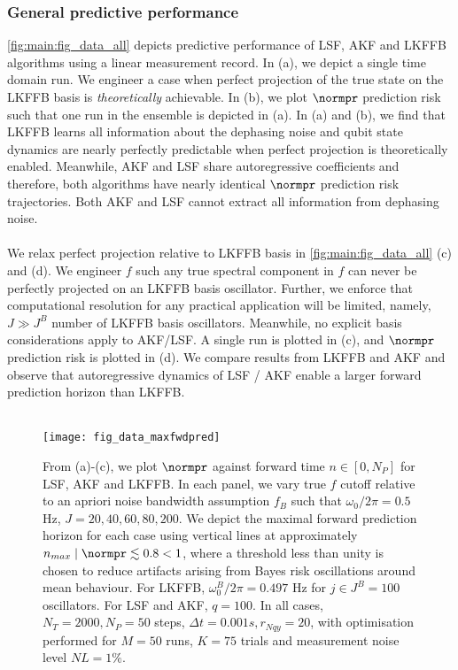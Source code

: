\subsubsection{General predictive performance}

\cref{fig:main:fig_data_all} depicts predictive performance of LSF, AKF and LKFFB algorithms using a linear measurement record. In (a), we depict a single time domain run. We engineer a case when perfect projection of the true state on the LKFFB basis is \textit{theoretically} achievable. In (b), we plot $\normpr$ prediction risk such that one run in the ensemble is depicted in (a).  In (a) and (b), we find that LKFFB learns all information about the dephasing noise and qubit state dynamics are nearly perfectly predictable when perfect projection is theoretically enabled. Meanwhile, AKF and LSF share autoregressive coefficients and therefore, both algorithms have nearly identical $\normpr$ prediction risk trajectories. Both AKF and LSF cannot extract all information from dephasing noise.
\\
\\
We relax perfect projection relative to LKFFB basis in \cref{fig:main:fig_data_all}  (c) and (d). We engineer $f$ such any true spectral component in $f$ can never be perfectly projected on an LKFFB basis oscillator. Further, we enforce that  computational resolution for any practical application will be limited, namely, $J \gg J^B$ number of LKFFB basis oscillators. Meanwhile, no explicit basis considerations apply to AKF/LSF. A single run is plotted in (c), and $\normpr$ prediction risk is plotted in (d). We compare results from LKFFB and AKF and observe that autoregressive dynamics of LSF / AKF enable a larger forward prediction horizon than LKFFB. 
\\
\\
\begin{figure}
    \texttt{[image: fig\_data\_maxfwdpred]}
    \caption{\label{fig:main:fig_data_maxfwdpred} From (a)-(c), we plot $\normpr$ against forward time $n \in [0, N_P]$ for LSF, AKF and LKFFB. In each panel, we vary true $f$ cutoff relative to an apriori noise bandwidth assumption $f_B$ such that $\omega_0 / 2\pi = 0.5$ Hz, $J = 20, 40, 60, 80, 200$. We depict the maximal forward prediction horizon for each case using vertical lines at approximately $ n_{max} \mid  \normpr \lesssim 0.8 < 1$, where a threshold less than unity is chosen to reduce artifacts arising from Bayes risk oscillations around mean behaviour. For LKFFB, $\omega_0^B / 2\pi = 0.497$ Hz for $j \in J^B = 100$ oscillators. For LSF and AKF, $q = 100$. In all cases,  $N_T = 2000, N_P = 50$ steps, $\Delta t = 0.001s, r_{Nqy}=20$, with optimisation performed for $M=50$ runs, $K=75$ trials and measurement noise level $NL = 1\%$.} 
\end{figure} 
